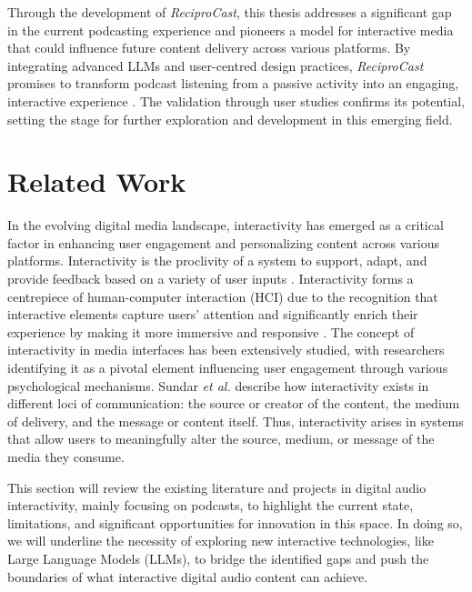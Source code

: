 \documentclass[12pt]{report}
\begin{document}
\begin{myfont}
        \indent Through the development of \textit{ReciproCast}, this thesis addresses a significant gap in the current podcasting experience and pioneers a model for interactive media that could influence future content delivery across various platforms. By integrating advanced LLMs and user-centred design practices, \textit{ReciproCast} promises to transform podcast listening from a passive activity into an engaging, interactive experience \citep{Hochheiser2017ExperimentalDesign}. The validation through user studies confirms its potential, setting the stage for further exploration and development in this emerging field.\\

        \chapter{Related Work}
        In the evolving digital media landscape, interactivity has emerged as a critical factor in enhancing user engagement and personalizing content across various platforms. Interactivity is the proclivity of a system to support, adapt, and provide feedback based on a variety of user inputs \citep{Sundar2010Designing}. Interactivity forms a centrepiece of human-computer interaction (HCI) due to the recognition that interactive elements capture users' attention and significantly enrich their experience by making it more immersive and responsive \citep{Sundar2010Designing}. The concept of interactivity in media interfaces has been extensively studied, with researchers identifying it as a pivotal element influencing user engagement through various psychological mechanisms. Sundar \textit{et al.} \citep{Sundar2010Designing} describe how interactivity exists in different loci of communication: the source or creator of the content, the medium of delivery, and the message or content itself. Thus, interactivity arises in systems that allow users to meaningfully alter the source, medium, or message of the media they consume.
        
        \indent This section will review the existing literature and projects in digital audio interactivity, mainly focusing on podcasts, to highlight the current state, limitations, and significant opportunities for innovation in this space. In doing so, we will underline the necessity of exploring new interactive technologies, like Large Language Models (LLMs), to bridge the identified gaps and push the boundaries of what interactive digital audio content can achieve.
        

\end{myfont}
\end{document}
